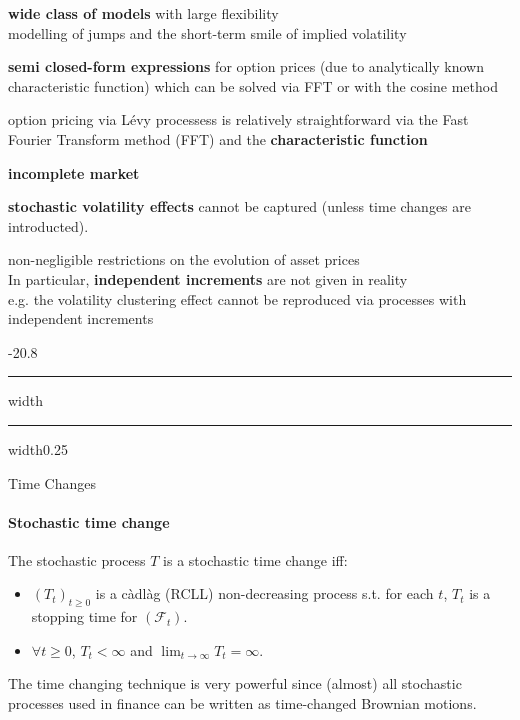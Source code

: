 \documentclass[a4paper,landscape,7pt,fleqn]{scrartcl}
\makeatletter
\renewcommand{\emph}[1]{\textbf{#1}}
\renewcommand{\subsection}{\@startsection{subsection}{1}{0mm}%
{-2\baselineskip}{0.8\baselineskip}%
{\hrule depth 0.2pt width\columnwidth\hrule depth0.75pt
width0.25\columnwidth\vspace*{1.2em}\large\bfseries}}
\makeatother
\begin{document}
\begin{multicols*}{3}
\begin{description}[style=multiline,leftmargin=0.3cm,font=\normalfont]
\item[+] \emph{wide class of models} with large flexibility \\
modelling of jumps and the short-term smile of implied volatility
\item[+] \emph{semi closed-form expressions} for option prices (due to analytically known characteristic function) which can be solved via FFT or with the cosine method
\item[+] option pricing via Lévy processess is relatively straightforward via the Fast Fourier Transform method (FFT) and the \emph{characteristic function}
\item[-] \emph{incomplete market}
\item[-] \emph{stochastic volatility effects} cannot be captured (unless time changes are introducted).
\item[-] non-negligible restrictions on the evolution of asset prices \\
In particular, \emph{independent increments} are not given in reality \\
e.g. the volatility clustering effect cannot be reproduced via processes with independent increments
\end{description}

\subsection{Time Changes}

\paragraph{Stochastic time change}
The stochastic process $T$ is a stochastic time change iff:
\begin{itemize}
\item $(T_t)_{t \geq 0}$ is a càdlàg (RCLL) non-decreasing process s.t. for each $t$, $T_t$ is a stopping time for $(\mathcal{F}_t)$.
\item $\forall t \geq 0$, $T_t < \infty$ and $\lim_{t \rightarrow \infty} T_t = \infty$.
\end{itemize}
The time changing technique is very powerful since (almost) all stochastic processes used in finance can be written as time-changed Brownian motions.


\end{multicols*}
\end{document}
